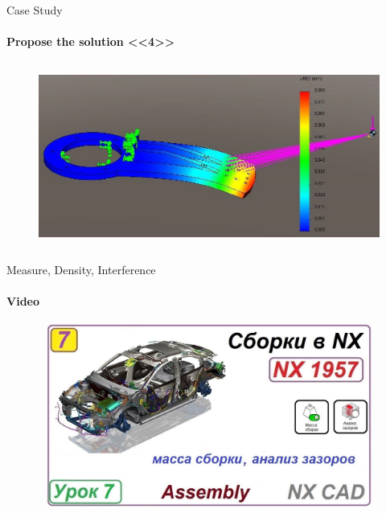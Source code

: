 \documentclass[aspectratio=169]{beamer}
\begin{document}
\begin{frame}[t]{Case Study}
    \framesubtitle{Propose the solution <<4>>}
        \vspace{-0.6cm}
        \begin{figure}[H]
            \centering\includegraphics[height=6cm,width=1\textwidth,keepaspectratio]{cae_ex4_sol.jpg}
            \label{fig:cae_ex4_sol.jpg}
        \end{figure}
    \end{frame}



\begin{frame}[t]{Measure, Density, Interference}
    \framesubtitle{Video}
    \vspace{-0.6cm}
    \begin{figure}[H]
        \href{https://disk.yandex.ru/i/bYO6blkIitLJnQ}{
            \centering\includegraphics[height=6cm,width=1\textwidth,keepaspectratio]{mass_density_inteference_preview.jpg}}
        \label{fig:mass_density_inteference_preview.jpg}
    \end{figure}
\end{frame}
\end{document}
